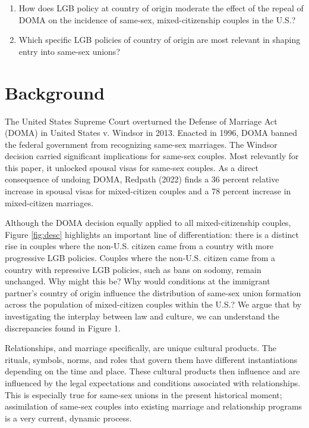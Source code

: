 \documentclass[
  11pt,
]{article}
\begin{document}
\begin{enumerate}
\def\labelenumi{\arabic{enumi}.}
\item
  How does LGB policy at country of origin moderate the effect of the repeal of DOMA on the incidence of same-sex, mixed-citizenship couples in the U.S.?
\item
  Which specific LGB policies of country of origin are most relevant in shaping entry into same-sex unions?
\end{enumerate}

\hypertarget{background}{%
\section{Background}\label{background}}

The United States Supreme Court overturned the Defense of Marriage Act (DOMA) in United States v. Windsor in 2013. Enacted in 1996, DOMA banned the federal government from recognizing same-sex marriages. The Windsor decision carried significant implications for same-sex couples. Most relevantly for this paper, it unlocked spousal visas for same-sex couples. As a direct consequence of undoing DOMA, Redpath (2022) finds a 36 percent relative increase in spousal visas for mixed-citizen couples and a 78 percent increase in mixed-citizen marriages.

Although the DOMA decision equally applied to all mixed-citizenship couples, Figure \ref{fig:desc} highlights an important line of differentiation: there is a distinct rise in couples where the non-U.S. citizen came from a country with more progressive LGB policies. Couples where the non-U.S. citizen came from a country with repressive LGB policies, such as bans on sodomy, remain unchanged. Why might this be? Why would conditions at the immigrant partner's country of origin influence the distribution of same-sex union formation across the population of mixed-citizen couples within the U.S.? We argue that by investigating the interplay between law and culture, we can understand the discrepancies found in Figure 1.

Relationships, and marriage specifically, are unique cultural products. The rituals, symbols, norms, and roles that govern them have different instantiations depending on the time and place. These cultural products then influence and are influenced by the legal expectations and conditions associated with relationships. This is especially true for same-sex unions in the present historical moment; assimilation of same-sex couples into existing marriage and relationship programs is a very current, dynamic process.
\end{document}
